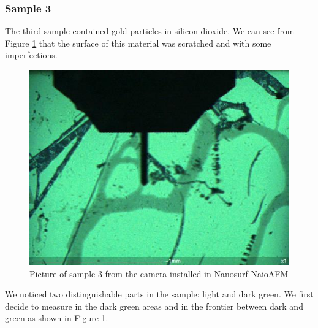 \documentclass[11pt,a4paper]{article}
\begin{document}
\subsubsection{Sample 3}
The third sample contained gold particles in silicon dioxide. We can see from Figure \ref{fig:sample_3_static} that the surface of this material was scratched and with some imperfections.

\begin{figure}[ht]
\centering
\includegraphics[scale=0.4]{sm_sample2_set.JPG}
\caption{Picture of sample 3 from the camera installed in Nanosurf NaioAFM}
\label{fig:sample_3_static}
\end{figure}

We noticed two distinguishable parts in the sample: light and dark green. We first decide to measure in the dark green areas and in the frontier between dark and green as shown in Figure \ref{fig:sample_3_static}.
\end{document}
